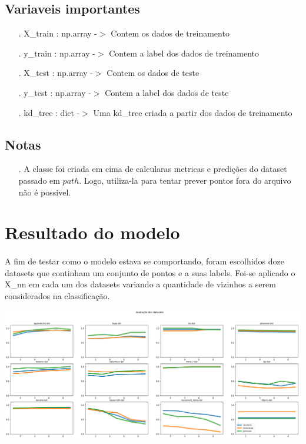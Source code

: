 \documentclass{article}
\begin{document}
\subsection{Variaveis importantes}

\begin{enumerate}
\item[.] X\_train : np.array -$>$ Contem os dados de treinamento
\item[.] y\_train : np.array -$>$ Contem a label dos dados de treinamento
\item[.] X\_test : np.array   -$>$  Contem os dados de teste
\item[.] y\_test : np.array   -$>$  Contem a label dos dados de teste
\item[.] kd\_tree : dict -$>$  Uma kd\_tree criada a partir dos dados de treinamento
\end{enumerate}

\subsection{Notas}

\begin{enumerate}
\item[.] A classe foi criada em cima de calcularas metricas e predições do dataset passado em $path$. Logo, utiliza-la para tentar prever pontos fora do arquivo não é possivel.
\end{enumerate}

\section{Resultado do modelo}

\paragraph{} A fim de testar como o modelo estava se comportando, foram escolhidos doze datasets que continham um conjunto de pontos e a suas labels. Foi-se aplicado o X\_nn em cada um dos datasets variando a quantidade de vizinhos a serem considerados na classificação. 
 
\includegraphics[width=\textwidth]{datasets.png}
\end{document}
